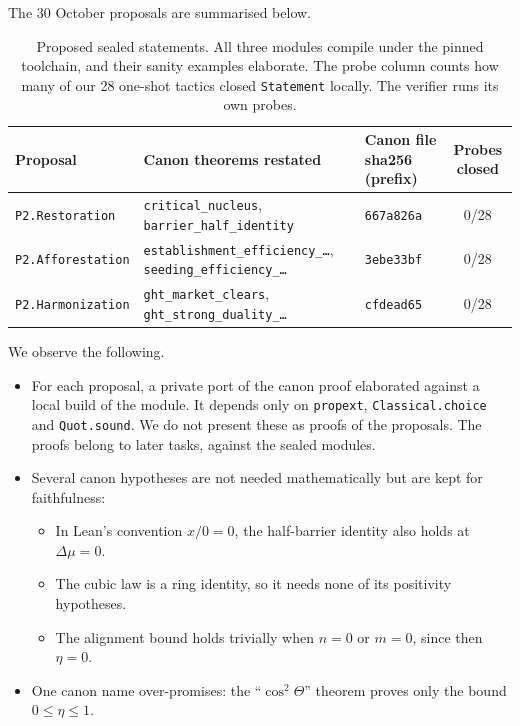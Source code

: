 \documentclass[11pt]{article}
\theoremstyle{definition}
\theoremstyle{remark}
\begin{document}
The 30 October proposals are summarised below.
\begin{table}[h]
\centering\small
\begin{tabular}{@{}p{}p{}lc@{}}
\toprule
Proposal & Canon theorems restated & Canon file sha256 (prefix) & Probes closed \\
\midrule
\texttt{P2.Restoration} & \texttt{critical\_nucleus}, \texttt{barrier\_half\_identity} & \texttt{667a826a} & 0/28 \\
\texttt{P2.Afforestation} & \texttt{establishment\_efficiency\_\ldots}, \texttt{seeding\_efficiency\_\ldots} & \texttt{3ebe33bf} & 0/28 \\
\texttt{P2.Harmonization} & \texttt{ght\_market\_clears}, \texttt{ght\_strong\_duality\_\ldots} & \texttt{cfdead65} & 0/28 \\
\bottomrule
\end{tabular}
\caption{Proposed sealed statements. All three modules compile under the pinned toolchain, and their sanity examples elaborate.
The probe column counts how many of our 28 one-shot tactics closed \texttt{Statement} locally. The verifier runs its own probes.}
\end{table}
We observe the following.
\begin{itemize}
\item For each proposal, a private port of the canon proof elaborated against a local build of the module.
It depends only on \texttt{propext}, \texttt{Classical.choice} and \texttt{Quot.sound}.
We do not present these as proofs of the proposals. The proofs belong to later tasks, against the sealed modules.
\item Several canon hypotheses are not needed mathematically but are kept for faithfulness:
\begin{itemize}
\item In Lean's convention $x/0=0$, the half-barrier identity also holds at $\Delta\mu=0$.
\item The cubic law is a ring identity, so it needs none of its positivity hypotheses.
\item The alignment bound holds trivially when $n=0$ or $m=0$, since then $\eta=0$.
\end{itemize}
\item One canon name over-promises: the ``$\cos^2\Theta$'' theorem proves only the bound $0\le\eta\le1$.
\end{itemize}
\end{document}
